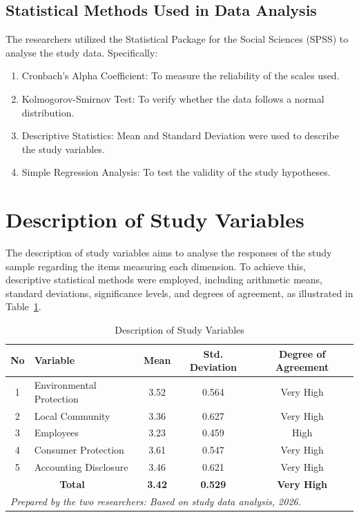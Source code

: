 \documentclass[10pt]{NSP1}
\begin{document}
	\subsection{Statistical Methods Used in Data Analysis}
	
	The researchers utilized the Statistical Package for the Social Sciences (SPSS) to analyse the study data. Specifically:
	\begin{enumerate}
		\item Cronbach's Alpha Coefficient: To measure the reliability of the scales used.
		\item Kolmogorov-Smirnov Test: To verify whether the data follows a normal distribution.
		\item Descriptive Statistics: Mean and Standard Deviation were used to describe the study variables.
		\item Simple Regression Analysis: To test the validity of the study hypotheses.
	\end{enumerate}
	
	\section{Description of Study Variables}
	
	The description of study variables aims to analyse the responses of the study sample regarding the items measuring each dimension. To achieve this, descriptive statistical methods were employed, including arithmetic means, standard deviations, significance levels, and degrees of agreement, as illustrated in Table~\ref{tab:description}.
	
	\begin{table}[H]
		\centering
		\caption{Description of Study Variables}
		\label{tab:description}
		\vspace{5pt}
		\small
		\begin{tabular}{clccc}
			\hline
			\textbf{No} & \textbf{Variable} & \textbf{Mean} & \textbf{Std. Deviation} & \textbf{Degree of Agreement} \\
			\hline
			1 & Environmental Protection & 3.52 & 0.564 & Very High \\
			2 & Local Community & 3.36 & 0.627 & Very High \\
			3 & Employees & 3.23 & 0.459 & High \\
			4 & Consumer Protection & 3.61 & 0.547 & Very High \\
			5 & Accounting Disclosure & 3.46 & 0.621 & Very High \\
			\hline
			\multicolumn{2}{c}{\textbf{Total}} & \textbf{3.42} & \textbf{0.529} & \textbf{Very High} \\
			\hline
			\multicolumn{5}{l}{\footnotesize \textit{Prepared by the two researchers: Based on study data analysis, 2026.}} \\
		\end{tabular}
	\end{table}
	
\end{document}
